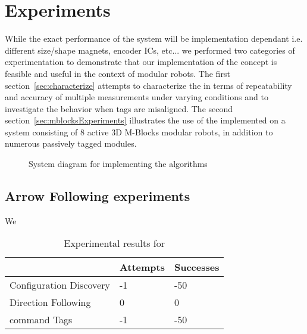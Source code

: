 \section{Experiments}
\label{sec:Experiments}
While the exact performance of the \tagName system will be implementation dependant i.e. different size/shape magnets, encoder ICs, etc... we performed two categories of experimentation to demonstrate that our implementation of the \tagName concept is feasible and useful in the context of modular robots. The first section~\ref{sec:characterize} attempts to characterize the \tagNamePlural in terms of repeatability and accuracy of multiple measurements under varying conditions and to investigate the behavior when tags are misaligned. The second section~\ref{sec:mblocksExperiments} illustrates the use of the \tagNamePlural implemented on a system consisting of 8 active 3D M-Blocks modular robots, in addition to numerous passively tagged modules.

\begin{figure}[ht]

	
	
	
	\caption{System diagram for implementing the algorithms}
	
	\label{fig:PlaneChanging2}
\end{figure}

\subsection{Arrow Following experiments}
\label{sec:mblocksExperimentsArrow}
We 

\begin{table}[h]
	\caption{Experimental results for }
	
	\begin{tabular}{ p{3.4cm}  p{1.9cm}  p{1.9cm} }
		\hline
								& Attempts 	& Successes \\
		\hline
		Configuration Discovery	&  -1 		& -50 \\
		Direction Following		& 0 		& 0  \\
		command Tags 			&  -1 		& -50 \\		
	\end{tabular}
	
	\label{tab:info}
\end{table}

